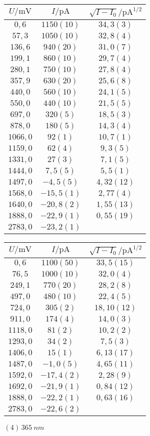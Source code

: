 \begin{figure}[htbp]
   \centering
\parbox{0.475\linewidth}{\centering
\begin{tabular}{c c c}
\hline$U / \unit{\milli\volt}$ & $I / \unit{\pico\ampere}$ & $\sqrt{I-I_0} / \unit{\pico\ampere\tothe{1/2}}$ \\ 
\hline
$0,6$ & $1150(10)$ & $34,3(3)$ \\
$57,3$ & $1050(10)$ & $32,8(4)$ \\
$136,6$ & $940(20)$ & $31,0(7)$ \\
$199,1$ & $860(10)$ & $29,7(4)$ \\
$280,1$ & $750(10)$ & $27,8(4)$ \\
$357,9$ & $630(20)$ & $25,6(8)$ \\
$440,0$ & $560(10)$ & $24,1(5)$ \\
$550,0$ & $440(10)$ & $21,5(5)$ \\
$697,0$ & $320(5)$ & $18,5(3)$ \\
$878,0$ & $180(5)$ & $14,3(4)$ \\
$1066,0$ & $92(1)$ & $10,7(1)$ \\
$1159,0$ & $62(4)$ & $9,3(5)$ \\
$1331,0$ & $27(3)$ & $7,1(5)$ \\
$1444,0$ & $7,5(5)$ & $5,5(1)$ \\
$1497,0$ & $-4,5(5)$ & $4,32(12)$ \\
$1568,0$ & $-15,5(1)$ & $2,77(4)$ \\
$1640,0$ & $-20,8(2)$ & $1,55(13)$ \\
$1888,0$ & $-22,9(1)$ & $0,55(19)$ \\
$2783,0$ & $-23,2(1)$ &    \\
\hline\end{tabular}
\caption{$(3)\,\SI{365}{nm}$}
}\quad\parbox{0.475\linewidth}{\centering
\begin{tabular}{c c c}
\hline$U / \unit{\milli\volt}$ & $I / \unit{\pico\ampere}$ & $\sqrt{I-I_0} / \unit{\pico\ampere\tothe{1/2}}$ \\ 
\hline
$0,6$ & $1100(50)$ & $33,5(15)$ \\
$76,5$ & $1000(10)$ & $32,0(4)$ \\
$249,1$ & $770(20)$ & $28,2(8)$ \\
$497,0$ & $480(10)$ & $22,4(5)$ \\
$724,0$ & $305(2)$ & $18,10(12)$ \\
$911,0$ & $174(4)$ & $14,0(3)$ \\
$1118,0$ & $81(2)$ & $10,2(2)$ \\
$1293,0$ & $34(2)$ & $7,5(3)$ \\
$1406,0$ & $15(1)$ & $6,13(17)$ \\
$1487,0$ & $-1,0(5)$ & $4,65(11)$ \\
$1592,0$ & $-17,4(2)$ & $2,28(9)$ \\
$1692,0$ & $-21,9(1)$ & $0,84(12)$ \\
$1888,0$ & $-22,2(1)$ & $0,63(16)$ \\
$2783,0$ & $-22,6(2)$ &    \\
\hline\end{tabular}
\caption{$(4)\,\SI{365}{nm}$}
}\end{figure}